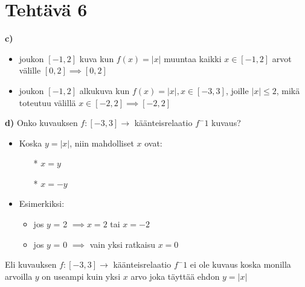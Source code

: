 \documentclass{article}
\begin{document}
        \section*{Tehtävä 6}
        \quad

        \textbf{c)}
        \begin{itemize}
            \item joukon $[-1, 2]$ kuva kun $f(x) = |x|$ muuntaa kaikki $x \in [-1, 2]$ arvot välille $[0, 2] \implies [0, 2]$
            \item joukon $[-1, 2]$ alkukuva kun $f(x) = |x|, x \in [-3, 3]$, joille $|x| \leq 2$, mikä toteutuu välillä $x \in [-2, 2] \implies [-2, 2]$
        \end{itemize}

        \textbf{d)}
        Onko kuvauksen $f : [-3, 3] \rightarrow $ käänteisrelaatio $f^-1$ kuvaus?
        \begin{itemize}
        \item Koska $y = |x|$, niin mahdolliset $x$ ovat:
            \begin{itemize}
                \item[*] $x = y$
                \item[*] $x = -y$
            \end{itemize}
        \item Esimerkiksi:
            \begin{itemize}
                \item jos $y$ = 2 $\implies x = 2$ tai $x = -2$
                \item jos $y$ = 0 $\implies$ vain yksi ratkaisu $x = 0$
            \end{itemize}
        \end{itemize}
        Eli kuvauksen $f : [-3, 3] \rightarrow $ käänteisrelaatio $f^-1$ ei ole kuvaus koska monilla arvoilla $y$ on useampi kuin yksi $x$ arvo joka täyttää ehdon $y = |x|$
        
\end{document}

